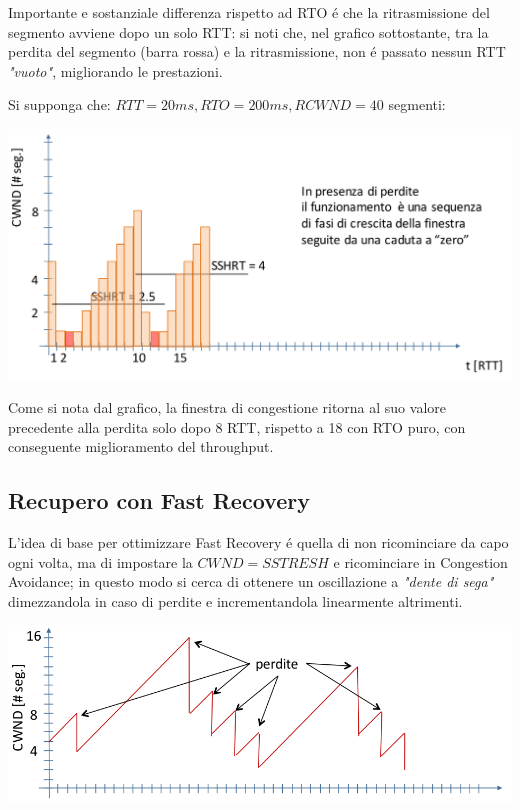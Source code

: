 \documentclass[12pt]{article}
\begin{document}
Importante e sostanziale differenza rispetto ad RTO \'e che la ritrasmissione del segmento avviene dopo 
un solo RTT: si noti che, nel grafico sottostante, tra la perdita del segmento (barra rossa) e la ritrasmissione,
non \'e passato nessun RTT \textit{"vuoto"}, migliorando le prestazioni.

Si supponga che: $RTT=20ms, RTO=200ms, RCWND=40$ segmenti:

\begin{center}
	\includegraphics[scale=0.35]{livello_trasporto-img14.png}
\end{center}

Come si nota dal grafico, la finestra di congestione ritorna al suo valore precedente alla perdita solo
dopo 8 RTT, rispetto a 18 con RTO puro, con conseguente miglioramento del throughput.

\clearpage
\subsection{Recupero con Fast Recovery}\label{recupero-delle-perdite-fast-recovery}
L'idea di base per ottimizzare Fast Recovery \'e quella di non ricominciare da capo ogni volta, ma di impostare
la $CWND = SSTRESH$ e ricominciare in Congestion Avoidance; in questo modo si cerca di ottenere un oscillazione a 
\textit{"dente di sega"} dimezzandola in caso di perdite e incrementandola linearmente altrimenti.
\begin{center}
	\includegraphics[scale=0.35]{livello_trasporto-img15.png}
\end{center}
\end{document}
